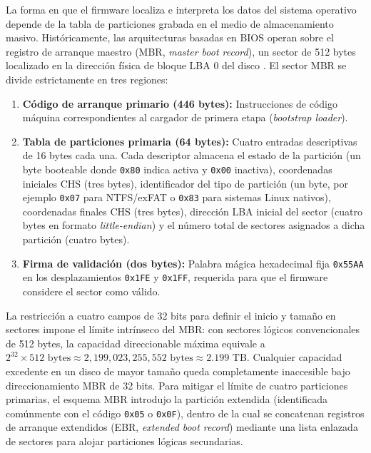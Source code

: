 \documentclass[12pt]{article}
\begin{document}
La forma en que el firmware localiza e interpreta los datos del sistema operativo depende de la tabla de particiones grabada en el medio de almacenamiento masivo. Históricamente, las arquitecturas basadas en BIOS operan sobre el registro de arranque maestro (MBR, \textit{master boot record}), un sector de 512 bytes localizado en la dirección física de bloque LBA 0 del disco \parencite[\S 12.5.2, p.\ 419]{silberschatz2006fundamentos}. El sector MBR se divide estrictamente en tres regiones:
\begin{enumerate}[noitemsep, topsep=2pt]
    \item \textbf{Código de arranque primario (446 bytes):} Instrucciones de código máquina correspondientes al cargador de primera etapa (\textit{bootstrap loader}).
    \item \textbf{Tabla de particiones primaria (64 bytes):} Cuatro entradas descriptivas de 16 bytes cada una. Cada descriptor almacena el estado de la partición (un byte booteable donde \texttt{0x80} indica activa y \texttt{0x00} inactiva), coordenadas iniciales CHS (tres bytes), identificador del tipo de partición (un byte, por ejemplo \texttt{0x07} para NTFS/exFAT o \texttt{0x83} para sistemas Linux nativos), coordenadas finales CHS (tres bytes), dirección LBA inicial del sector (cuatro bytes en formato \textit{little-endian}) y el número total de sectores asignados a dicha partición (cuatro bytes).
    \item \textbf{Firma de validación (dos bytes):} Palabra mágica hexadecimal fija \texttt{0x55AA} en los desplazamientos \texttt{0x1FE} y \texttt{0x1FF}, requerida para que el firmware considere el sector como válido.
\end{enumerate}

La restricción a cuatro campos de 32 bits para definir el inicio y tamaño en sectores impone el límite intrínseco del MBR: con sectores lógicos convencionales de 512 bytes, la capacidad direccionable máxima equivale a $2^{32} \times 512 \text{ bytes} \approx 2{,}199{,}023{,}255{,}552 \text{ bytes} \approx 2.199 \text{ TB}$. Cualquier capacidad excedente en un disco de mayor tamaño queda completamente inaccesible bajo direccionamiento MBR de 32 bits. Para mitigar el límite de cuatro particiones primarias, el esquema MBR introdujo la partición extendida (identificada comúnmente con el código \texttt{0x05} o \texttt{0x0F}), dentro de la cual se concatenan registros de arranque extendidos (EBR, \textit{extended boot record}) mediante una lista enlazada de sectores para alojar particiones lógicas secundarias.
\end{document}
